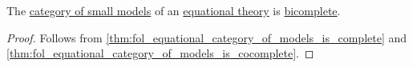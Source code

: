 \begin{corollary}\label{thm:fol_equational_category_of_models_is_bicomplete}
  The \hyperref[def:fol_theory_model_functor/obj]{category of small models} of an \hyperref[def:fol_equational_theory]{equational theory} is \hyperref[def:cocomplete_category]{bicomplete}.
\end{corollary}
\begin{proof}
  Follows from \cref{thm:fol_equational_category_of_models_is_complete} and \cref{thm:fol_equational_category_of_models_is_cocomplete}.
\end{proof}
